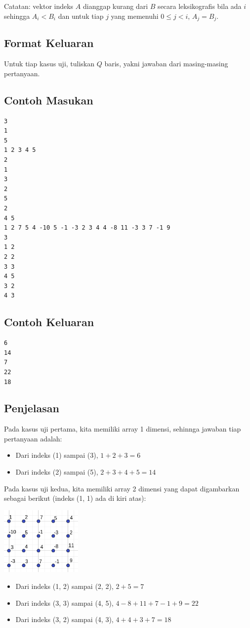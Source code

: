 \documentclass{article}
\begin{document}
Catatan: vektor indeks $A$ dianggap kurang dari $B$ secara leksikografis bila ada $i$ sehingga $A_i < B_i$ dan untuk tiap $j$ yang memenuhi $0 \leq j < i$, $A_j = B_j$.

\subsection*{Format Keluaran}

Untuk tiap kasus uji, tuliskan $Q$ baris, yakni jawaban dari masing-masing pertanyaan.

\pagebreak

\begin{multicols}{2}
\subsection*{Contoh Masukan}
\begin{lstlisting}
3
1
5
1 2 3 4 5
2
1
3
2
5
2
4 5
1 2 7 5 4 -10 5 -1 -3 2 3 4 4 -8 11 -3 3 7 -1 9
3
1 2
2 2
3 3
4 5
3 2
4 3
\end{lstlisting}
\columnbreak
\subsection*{Contoh Keluaran}
\begin{lstlisting}
6
14
7
22
18
\end{lstlisting}
\vfill
\null
\end{multicols}

\subsection*{Penjelasan}
Pada kasus uji pertama, kita memiliki array 1 dimensi, sehinnga jawaban tiap pertanyaan adalah:
\begin{itemize}
    \item Dari indeks (1) sampai (3), $1 + 2 + 3 = 6$
    \item Dari indeks (2) sampai (5), $2 + 3 + 4 + 5 = 14$
\end{itemize}

Pada kasus uji kedua, kita memiliki array 2 dimensi yang dapat digambarkan sebagai berikut (indeks (1, 1) ada di kiri atas):

\includegraphics[width=150px]{sample-2}

\begin{itemize}
    \item Dari indeks (1, 2) sampai (2, 2), $2 + 5 = 7$
    \item Dari indeks (3, 3) sampai (4, 5), $4 - 8 + 11 + 7 - 1 + 9 = 22$
    \item Dari indeks (3, 2) sampai (4, 3), $4 + 4 + 3 + 7 = 18$
\end{itemize}

\pagebreak
\end{document}
